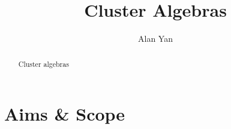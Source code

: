 \documentclass[]{pcmi}
\theoremstyle{plain}
\theoremstyle{definition}
\begin{document}
%
%
%
%
%
%

\title[Cluster Algebras]{Cluster Algebras} 

%    
%    
\author{Alan Yan}
\date{} 
\address{}
\email{}

\keywords{}
\begin{abstract}
    Cluster algebras
\end{abstract}

%    
%    
\maketitle

\tableofcontents

%    
%    



\section{Aims \& Scope} 
\end{document}

